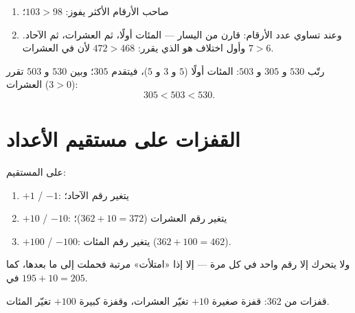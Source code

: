 \begin{method}\label{met:g2:numbers:compare}
\begin{enumerate}
  \item صاحب الأرقام الأكثر يفوز: $103 > 98$؛
  \item وعند تساوي عدد الأرقام: قارن من اليسار --- المئات أولًا،
        ثم العشرات، ثم الآحاد. وأول اختلاف هو الذي يقرر:
        $472 > 468$ لأن في العشرات $7 > 6$.
\end{enumerate}
\end{method}

\begin{example}\label{ex:g2:numbers:order}
رتّب $530$ و $305$ و $503$: المئات أولًا ($5$ و $3$ و $5$)، فيتقدم
$305$؛ وبين $530$ و $503$ تقرر العشرات ($3 > 0$):
\[
305 < 503 < 530 .
\]
\end{example}

\section{القفزات على مستقيم الأعداد}

\begin{method}\label{met:g2:numbers:jumps}
على المستقيم:
\begin{enumerate}
  \item $+1$ / $-1$: يتغير رقم الآحاد؛
  \item $+10$ / $-10$: يتغير رقم العشرات ($362 + 10 = 372$)؛
  \item $+100$ / $-100$: يتغير رقم المئات ($362 + 100 = 462$).
\end{enumerate}
ولا يتحرك إلا رقم واحد في كل مرة --- إلا إذا «امتلأت» مرتبة
فحملت إلى ما بعدها، كما في $195 + 10 = 205$.
\end{method}

\begin{omfigure}

{\small قفزات من $362$: قفزة صغيرة $+10$ تغيّر العشرات، وقفزة
كبيرة $+100$ تغيّر المئات.}
\end{omfigure}

